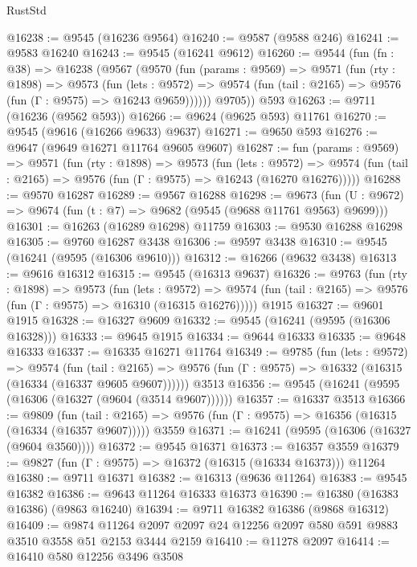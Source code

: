 \begin{lexlean}{RustStd}
\begin{coremodule}
@16238 := @9545 (@16236 @9564)
@16240 := @9587 (@9588 @246)
@16241 := @9583 @16240
@16243 := @9545 (@16241 @9612)
@16260 := @9544
    (fun (fn : @38) =>
    @16238
      (@9567
        (@9570
          (fun (params : @9569) =>
          @9571
            (fun (rty : @1898) =>
            @9573
              (fun (lets : @9572) =>
              @9574 (fun (tail : @2165) => @9576 (fun (Γ : @9575) => @16243 @9659))))))
        @9705))
    @593
@16263 := @9711 (@16236 (@9562 @593))
@16266 := @9624 (@9625 @593) @11761
@16270 := @9545 (@9616 (@16266 @9633) @9637)
@16271 := @9650 @593
@16276 := @9647 (@9649 @16271 @11764 @9605 @9607)
@16287 := fun (params : @9569) =>
  @9571
    (fun (rty : @1898) =>
    @9573
      (fun (lets : @9572) =>
      @9574 (fun (tail : @2165) => @9576 (fun (Γ : @9575) => @16243 (@16270 @16276)))))
@16288 := @9570 @16287
@16289 := @9567 @16288
@16298 := @9673
    (fun (U : @9672) => @9674 (fun (t : @7) => @9682 (@9545 (@9688 @11761 @9563) @9699)))
@16301 := @16263 (@16289 @16298) @11759
@16303 := @9530 @16288 @16298
@16305 := @9760 @16287 @3438
@16306 := @9597 @3438
@16310 := @9545 (@16241 (@9595 (@16306 @9610)))
@16312 := @16266 (@9632 @3438)
@16313 := @9616 @16312
@16315 := @9545 (@16313 @9637)
@16326 := @9763
    (fun (rty : @1898) =>
    @9573
      (fun (lets : @9572) =>
      @9574 (fun (tail : @2165) => @9576 (fun (Γ : @9575) => @16310 (@16315 @16276)))))
    @1915
@16327 := @9601 @1915
@16328 := @16327 @9609
@16332 := @9545 (@16241 (@9595 (@16306 @16328)))
@16333 := @9645 @1915
@16334 := @9644 @16333
@16335 := @9648 @16333
@16337 := @16335 @16271 @11764
@16349 := @9785
    (fun (lets : @9572) =>
    @9574
      (fun (tail : @2165) =>
      @9576 (fun (Γ : @9575) => @16332 (@16315 (@16334 (@16337 @9605 @9607))))))
    @3513
@16356 := @9545 (@16241 (@9595 (@16306 (@16327 (@9604 (@3514 @9607))))))
@16357 := @16337 @3513
@16366 := @9809
    (fun (tail : @2165) => @9576 (fun (Γ : @9575) => @16356 (@16315 (@16334 (@16357 @9607)))))
    @3559
@16371 := @16241 (@9595 (@16306 (@16327 (@9604 @3560))))
@16372 := @9545 @16371
@16373 := @16357 @3559
@16379 := @9827 (fun (Γ : @9575) => @16372 (@16315 (@16334 @16373))) @11264
@16380 := @9711 @16371
@16382 := @16313 (@9636 @11264)
@16383 := @9545 @16382
@16386 := @9643 @11264 @16333 @16373
@16390 := @16380 (@16383 @16386) (@9863 @16240)
@16394 := @9711 @16382 @16386 (@9868 @16312)
@16409 := @9874
    @11264
    @2097
    @2097
    @24
    @12256
    @2097
    @580
    @591
    @9883
    @3510
    @3558
    @51
    @2153
    @3444
    @2159
@16410 := @11278 @2097
@16414 := @16410 @580 @12256 @3496 @3508

\end{coremodule}
\end{lexlean}
